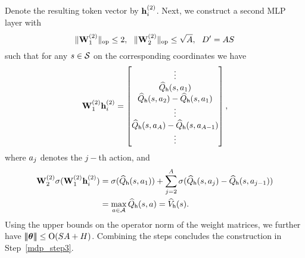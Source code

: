  Denote the resulting token vector by ${\mathbf h}_i^{(2)}$.
 Next, we construct a second MLP layer with $$\|{{\mathbf W}_1^{(2)}}\|_{\mathrm{op}}\leq2,~~\|{{\mathbf W}_2^{(2)}}\|_{\mathrm{op}}\leq\sqrt{{A}},~~{D'}={A}{S}
 $$ such that for any ${s}\in{\mathcal{S}}$ on the corresponding coordinates we have
 \begin{align*}
     {\mathbf W}_1^{(2)}{\mathbf h}_i^{(2)}=\begin{bmatrix}
        \vdots\\ {\widehat{{Q}}}_{\mathsf{h}}({s},{a}_1)\\
         {\widehat{{Q}}}_{\mathsf{h}}({s},{a}_2)-{\widehat{{Q}}}_{\mathsf{h}}({s},{a}_1)\\
         \vdots\\
          {\widehat{{Q}}}_{\mathsf{h}}({s},{a}_{A})-{\widehat{{Q}}}_{\mathsf{h}}({s},{a}_{{A}-1})
    \\ \vdots\end{bmatrix},
 \end{align*}
 where ${a}_j$ denotes the $j-$th action,
 and
 \begin{align*}
  {\mathbf W}^{(2)}_2\sigma({\mathbf W}^{(2)}_1{\mathbf h}_i^{(2)})
 &=
 \sigma({\widehat{{Q}}}_{\mathsf{h}}({s},{a}_1))+\sum_{j=2}^{A}\sigma( {\widehat{{Q}}}_{\mathsf{h}}({s},{a}_j)-{\widehat{{Q}}}_{\mathsf{h}}({s},{a}_{j-1}))\\
 &=\max_{{a}\in{\mathcal{A}}}{\widehat{{Q}}}_{\mathsf{h}}({s},{a})={\widehat{{{V}}}}_{\mathsf{h}}({s}).
 \end{align*}
 Using the upper bounds on the operator norm of the  weight matrices, we further have ${\left|\!\left|\!\left|{{{\boldsymbol \theta}}}\right|\!\right|\!\right|}\leq{\mathrm{O}}({S}{A}+{H})$.
Combining the steps concludes the construction in Step~\ref{mdp_step3}.





